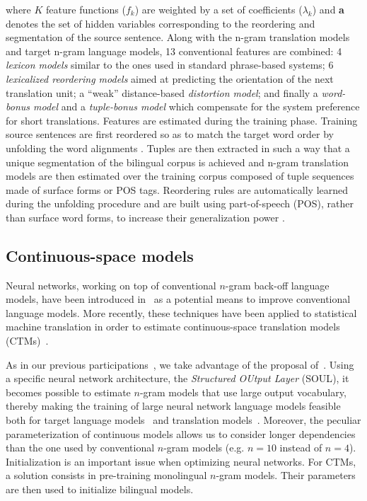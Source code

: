 \documentclass[11pt]{article}
\newcommand{\soul}{\textsc{SOUL}\xspace}
\newcommand{\ngram}{\mbox{$n$-gram}\xspace}
\begin{document}
where $K$ feature functions ($f_k$) are weighted by a set of
coefficients ($\lambda_k$) and \textbf{a} denotes the set of hidden
variables corresponding to the reordering and segmentation of the
source sentence. Along with the n-gram translation models and target
n-gram language models, 13 conventional features are combined: 4 {\it
  lexicon models} similar to the ones used in standard phrase-based
systems; 6 {\it lexicalized reordering models}
\cite{Tillmann04,Crego11ncode} aimed at predicting the orientation of
the next translation unit; a ``weak'' distance-based {\it distortion
  model}; and finally a {\it word-bonus model} and a {\it tuple-bonus
  model} which compensate for the system preference for short
translations.  Features are estimated during the training phase.
Training source sentences are first reordered so as to match the
target word order by unfolding the word alignments
\cite{Crego06Improving}.  Tuples are then extracted in such a way that
a unique segmentation of the bilingual corpus is achieved
\cite{Marino06} and n-gram translation models are then estimated over
the training corpus composed of tuple sequences made of surface forms
or POS tags.  Reordering rules are automatically learned during the
unfolding procedure and are built using part-of-speech (POS), rather
than surface word forms, to increase their generalization power
\cite{Crego06Improving}.


\subsection{Continuous-space models}
\label{ssec:soul}

Neural networks, working on top of conventional $n$-gram back-off
language models, have been introduced
in~\cite{Bengio03NNLM,Schwenk06CSLM} as a potential means to improve
conventional language models.  More recently, these techniques have
been applied to statistical machine translation in order to estimate
continuous-space translation models
(CTMs)~\cite{Schwenk07Smooth,Le12continuous,Devlin14fast}.

As in our previous
participations~\cite{Le12limsi,Allauzen13limsi,Pecheux14wmt,Marie15LIMSI},
we take advantage of the proposal of~\cite{Le12continuous}. Using a
specific neural network architecture, the \textit{Structured OUtput
  Layer} (\soul), it becomes possible to estimate $n$-gram models that
use large output vocabulary, thereby making the training of large
neural network language models feasible both for target language
models~\cite{Le11Soul} and translation
models~\cite{Le12continuous}. Moreover, the peculiar parameterization
of continuous models allows us to consider longer dependencies than
the one used by conventional $n$-gram models (e.g. $n=10$ instead of
$n=4$). Initialization is an important issue when optimizing neural
networks.  For CTMs, a solution consists in pre-training monolingual
\ngram models. Their parameters are then used to initialize bilingual
models.
\end{document}
